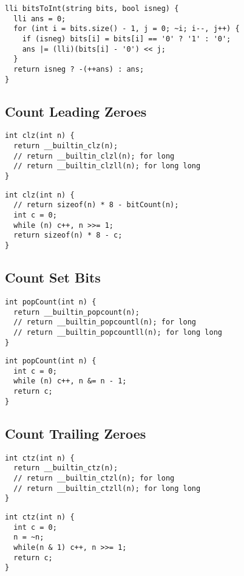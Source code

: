 \documentclass[twoside]{article}
\begin{document}
\begin{multicols*}{2}
\begin{verbatim}
lli bitsToInt(string bits, bool isneg) {
  lli ans = 0;
  for (int i = bits.size() - 1, j = 0; ~i; i--, j++) {
    if (isneg) bits[i] = bits[i] == '0' ? '1' : '0';
    ans |= (lli)(bits[i] - '0') << j;
  }
  return isneg ? -(++ans) : ans;
}
\end{verbatim}

\subsectionfont{\large\bfseries\sffamily\underline}
\subsection*{Count Leading Zeroes}
\begin{verbatim}
int clz(int n) {
  return __builtin_clz(n);
  // return __builtin_clzl(n); for long
  // return __builtin_clzll(n); for long long
}
\end{verbatim}
\vspace{-12pt}
\begin{verbatim}
int clz(int n) {
  // return sizeof(n) * 8 - bitCount(n);
  int c = 0;
  while (n) c++, n >>= 1;
  return sizeof(n) * 8 - c;
}
\end{verbatim}

\subsectionfont{\large\bfseries\sffamily\underline}
\subsection*{Count Set Bits}
\begin{verbatim}
int popCount(int n) {
  return __builtin_popcount(n);
  // return __builtin_popcountl(n); for long
  // return __builtin_popcountll(n); for long long
}
\end{verbatim}
\vspace{-12pt}
\begin{verbatim}
int popCount(int n) {
  int c = 0;
  while (n) c++, n &= n - 1;
  return c;
}
\end{verbatim}

\subsectionfont{\large\bfseries\sffamily\underline}
\subsection*{Count Trailing Zeroes}
\begin{verbatim}
int ctz(int n) {
  return __builtin_ctz(n);
  // return __builtin_ctzl(n); for long
  // return __builtin_ctzll(n); for long long
}
\end{verbatim}
\vspace{-12pt}
\begin{verbatim}
int ctz(int n) {
  int c = 0;
  n = ~n;
  while(n & 1) c++, n >>= 1;
  return c;
}
\end{verbatim}


\end{multicols*}
\end{document}
